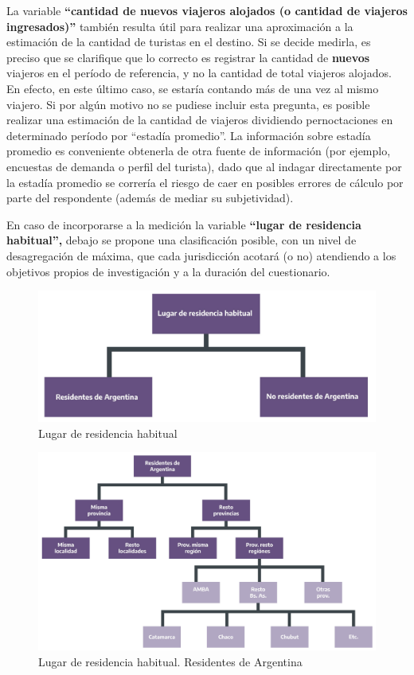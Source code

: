 \documentclass[
]{book}
\begin{document}
La variable \textbf{``cantidad de nuevos viajeros alojados (o cantidad de viajeros ingresados)''} también resulta útil para realizar una aproximación a la estimación de la cantidad de turistas en el destino. Si se decide medirla, es preciso que se clarifique que lo correcto es registrar la cantidad de \textbf{nuevos} viajeros en el período de referencia, y no la cantidad de total viajeros alojados. En efecto, en este último caso, se estaría contando más de una vez al mismo viajero. Si por algún motivo no se pudiese incluir esta pregunta, es posible realizar una estimación de la cantidad de viajeros dividiendo pernoctaciones en determinado período por ``estadía promedio''. La información sobre estadía promedio es conveniente obtenerla de otra fuente de información (por ejemplo, encuestas de demanda o perfil del turista), dado que al indagar directamente por la estadía promedio se correría el riesgo de caer en posibles errores de cálculo por parte del respondente (además de mediar su subjetividad).

En caso de incorporarse a la medición la variable \textbf{``lugar de residencia habitual'',} debajo se propone una clasificación posible, con un nivel de desagregación de máxima, que cada jurisdicción acotará (o no) atendiendo a los objetivos propios de investigación y a la duración del cuestionario.

\begin{figure}

{\centering \includegraphics[width=0.8\linewidth]{imagenes/figura_2} 

}

\caption{Lugar de residencia habitual}\label{fig:residencia-habitual}
\end{figure}

\begin{figure}

{\centering \includegraphics[width=0.8\linewidth]{imagenes/figura_2_1} 

}

\caption{Lugar de residencia habitual. Residentes de Argentina}\label{fig:residentes}
\end{figure}
\end{document}
